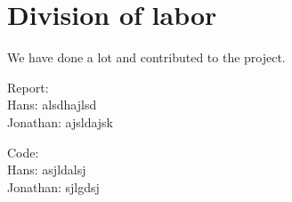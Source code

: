 \section*{Division of labor}

We have done a lot and contributed to the project. 

Report: \\
Hans: alsdhajlsd \\
Jonathan: ajsldajsk

Code: \\
Hans: asjldalsj\\
Jonathan: sjlgdsj
